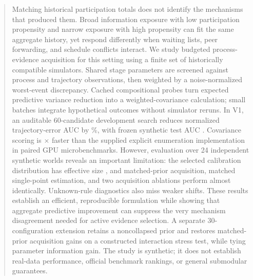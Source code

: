 \begin{abstract}
Matching historical participation totals does not identify the mechanisms that produced them. Broad information exposure with low participation propensity and narrow exposure with high propensity can fit the same aggregate history, yet respond differently when waiting lists, peer forwarding, and schedule conflicts interact. We study budgeted process-evidence acquisition for this setting using a finite set of historically compatible simulators. Shared stage parameters are screened against process and trajectory observations, then weighted by a noise-normalized worst-event discrepancy. Cached compositional probes turn expected predictive variance reduction into a weighted-covariance calculation; small batches integrate hypothetical outcomes without simulator reruns. In V1, an auditable 60-candidate development search reduces normalized trajectory-error AUC by \DevReduction\%, with frozen synthetic test AUC \TestAUC. Covariance scoring is \FrozenSpeed$\times$ faster than the supplied explicit enumeration implementation in paired GPU microbenchmarks. However, evaluation over 24 independent synthetic worlds reveals an important limitation: the selected calibration distribution has effective size \ESS, and matched-prior acquisition, matched single-point estimation, and two acquisition ablations perform almost identically. Unknown-rule diagnostics also miss weaker shifts. These results establish an efficient, reproducible formulation while showing that aggregate predictive improvement can suppress the very mechanism disagreement needed for active evidence selection. A separate 30-configuration extension retains a noncollapsed prior and restores matched-prior acquisition gains on a constructed interaction stress test, while tying parameter information gain. The study is synthetic; it does not establish real-data performance, official benchmark rankings, or general submodular guarantees.
\end{abstract}
